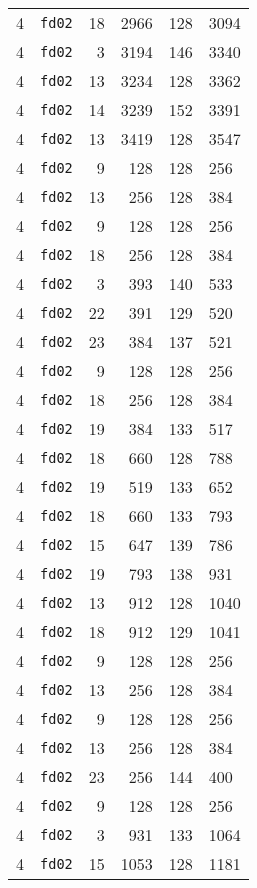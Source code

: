 \documentclass{article}
\begin{document}
\begin{table}[h!]
\begin{tabular}{llrrrl}
    4 & \texttt{fd02} & 18 & 2966 & 128 & 3094 \\
    4 & \texttt{fd02} & 3 & 3194 & 146 & 3340 \\
    4 & \texttt{fd02} & 13 & 3234 & 128 & 3362 \\
    4 & \texttt{fd02} & 14 & 3239 & 152 & 3391 \\
    4 & \texttt{fd02} & 13 & 3419 & 128 & 3547 \\
    4 & \texttt{fd02} & 9 & 128 & 128 & 256 \\
    4 & \texttt{fd02} & 13 & 256 & 128 & 384 \\
    4 & \texttt{fd02} & 9 & 128 & 128 & 256 \\
    4 & \texttt{fd02} & 18 & 256 & 128 & 384 \\
    4 & \texttt{fd02} & 3 & 393 & 140 & 533 \\
    4 & \texttt{fd02} & 22 & 391 & 129 & 520 \\
    4 & \texttt{fd02} & 23 & 384 & 137 & 521 \\
    4 & \texttt{fd02} & 9 & 128 & 128 & 256 \\
    4 & \texttt{fd02} & 18 & 256 & 128 & 384 \\
    4 & \texttt{fd02} & 19 & 384 & 133 & 517 \\
    4 & \texttt{fd02} & 18 & 660 & 128 & 788 \\
    4 & \texttt{fd02} & 19 & 519 & 133 & 652 \\
    4 & \texttt{fd02} & 18 & 660 & 133 & 793 \\
    4 & \texttt{fd02} & 15 & 647 & 139 & 786 \\
    4 & \texttt{fd02} & 19 & 793 & 138 & 931 \\
    4 & \texttt{fd02} & 13 & 912 & 128 & 1040 \\
    4 & \texttt{fd02} & 18 & 912 & 129 & 1041 \\
    4 & \texttt{fd02} & 9 & 128 & 128 & 256 \\
    4 & \texttt{fd02} & 13 & 256 & 128 & 384 \\
    4 & \texttt{fd02} & 9 & 128 & 128 & 256 \\
    4 & \texttt{fd02} & 13 & 256 & 128 & 384 \\
    4 & \texttt{fd02} & 23 & 256 & 144 & 400 \\
    4 & \texttt{fd02} & 9 & 128 & 128 & 256 \\
    4 & \texttt{fd02} & 3 & 931 & 133 & 1064 \\
    4 & \texttt{fd02} & 15 & 1053 & 128 & 1181 \\

\end{tabular}
\end{table}
\end{document}
